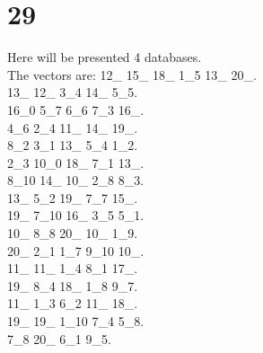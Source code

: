 \chapter{29}
\indent Here will be presented 4 databases.\\
The vectors are:
12\_ 15\_ 18\_ 1\_5 13\_ 20\_.\\13\_ 12\_ 3\_4 14\_ 5\_5.\\16\_0 5\_7 6\_6 7\_3 16\_.\\4\_6 2\_4 11\_ 14\_ 19\_.\\8\_2 3\_1 13\_ 5\_4 1\_2.\\2\_3 10\_0 18\_ 7\_1 13\_.\\8\_10 14\_ 10\_ 2\_8 8\_3.\\13\_ 5\_2 19\_ 7\_7 15\_.\\19\_ 7\_10 16\_ 3\_5 5\_1.\\10\_ 8\_8 20\_ 10\_ 1\_9.\\20\_ 2\_1 1\_7 9\_10 10\_.\\11\_ 11\_ 1\_4 8\_1 17\_.\\19\_ 8\_4 18\_ 1\_8 9\_7.\\11\_ 1\_3 6\_2 11\_ 18\_.\\19\_ 19\_ 1\_10 7\_4 5\_8.\\7\_8 20\_ 6\_1 9\_5.\\